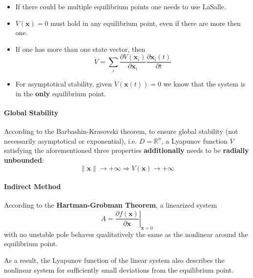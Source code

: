 \newpar{}
\begin{itemize}
    \item If there could be multiple equilibrium points one needs to use LaSalle.
    \item $V(\mathbf{x})=0$ must hold in any equilibrium point, even if there are more then one.
    \item If one has more than one state vector, then
          \begin{equation*}
              \dot{V}=\sum_{i} \frac{\partial V(\mathbf{x}_i)}{\partial \mathbf{x}_i} \frac{\partial \mathbf{x}_i(t)}{\partial t}
          \end{equation*}
    \item For asymptotical stability, given $\dot{V}(\mathbf{x}(t)) = 0$ we know that the system is in the \textbf{only} equilibrium point.
\end{itemize}

\paragraph{Global Stability}
According to the Barbashin-Krasovski theorem, to ensure global stability (not necessarily asymptotical or exponential), i.e. $D=\mathbb{R}^n$, a Lyapunov function $V$ satisfying the aforementioned three properties \textbf{additionally} needs to be \textbf{radially unbounded}:
\noindent\begin{equation*}
    \|\mathbf{x}\| \to +\infty \Rightarrow V(\mathbf{x}) \to +\infty
\end{equation*}

\paragraph{Indirect Method}
According to the \textbf{Hartman-Grobman Theorem}, a linearized system
\noindent\begin{equation*}
    A = \left.\frac{\partial f(\mathbf{x})}{\partial \mathbf{x}} \right|_{\mathbf{x} = 0}
\end{equation*} with no unstable pole behaves qualitatively the same as the nonlinear around the equilibrium point.

\newpar{}
As a result, the Lyapunov function of the linear system also describes the nonlinear system for sufficiently small deviations from the equilibrium point.

